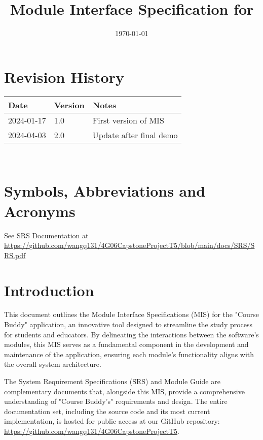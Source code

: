 \documentclass[12pt, titlepage]{article}
\begin{document}
\title{Module Interface Specification for \progname{}}

\author{\authname}

\date{\today}

\maketitle


\section{Revision History}

\begin{tabularx}{\textwidth}{p{3cm}p{2cm}X}
\toprule {\bf Date} & {\bf Version} & {\bf Notes}\\
\midrule
2024-01-17 & 1.0 & First version of MIS\\
2024-04-03 & 2.0 & Update after final demo\\
\bottomrule
\end{tabularx}

~\newpage

\section{Symbols, Abbreviations and Acronyms}

See SRS Documentation at \url{https://github.com/wangq131/4G06CapstoneProjectT5/blob/main/docs/SRS/SRS.pdf}


\newpage

\tableofcontents

\newpage


\section{Introduction}
This document outlines the Module Interface Specifications (MIS) for the "Course Buddy" application, an innovative tool designed to streamline the study process for students and educators. By delineating the interactions between the software's modules, this MIS serves as a fundamental component in the development and maintenance of the application, ensuring each module's functionality aligns with the overall system architecture.

The System Requirement Specifications (SRS) and Module Guide are complementary documents that, alongside this MIS, provide a comprehensive understanding of "Course Buddy's" requirements and design. The entire documentation set, including the source code and its most current implementation, is hosted for public access at our GitHub repository: \url{https://github.com/wangq131/4G06CapstoneProjectT5}.
\end{document}
